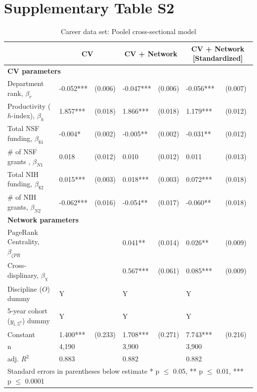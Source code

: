 \documentclass[10pt]{article}          %
\begin{document}
\section{Supplementary Table S2}
\begin{table}[h]
\begin{tabular}{m{5cm} m{1.5cm} m{1.5cm} m{1.5cm} m{1.5cm} p{1.5cm} p{1.5cm} }
\hline
\hline
& \multicolumn{2}{c}{\textbf{CV}} & \multicolumn{2}{c}{\textbf{CV + Network}} & \multicolumn{2}{c}{\textbf{CV + Network [Standardized]}} \\ \hline
\multicolumn{7}{l}{\textbf{CV parameters}} \\
{Department rank, $\beta_r$}          & -0.052***  & (0.006) & -0.047***  & (0.006) & -0.056***   & (0.007) \\
{Productivity ($h$-index), $\beta_h$} & 1.857***   & (0.018) & 1.866***   & (0.018) & 1.179***    & (0.012) \\
{Total NSF funding, $\beta_{\$1}$}    & -0.004*    & (0.002) & -0.005**   & (0.002) & -0.031**    & (0.012) \\
{\# of NSF grants , $\beta_{N1}$}     & 0.018      & (0.012) & 0.010      & (0.012) & 0.011       & (0.013) \\
{Total NIH funding, $\beta_{\$2}$}    & 0.015***   & (0.003) & 0.018***   & (0.003) & 0.072***    & (0.018) \\
{\# of NIH grants, $\beta_{N2}$}      & -0.062***  & (0.016) & -0.054**   & (0.017) & -0.060**    & (0.018) \\ \hline

\multicolumn{7}{l}{\textbf{Network parameters}} \\
{PageRank Centrality, $\beta_{\zeta PR}$}   &  &            & 0.041**     & (0.014) & 0.026**   & (0.009) \\
{Cross-displinary, $\beta_{\chi}$}       &  &            & 0.567***    & (0.061) & 0.085***  & (0.009) \\ \hline

{Discipline ($O$) dummy}                & Y &  & Y &  & Y &  \\
{5-year cohort ($y_{i,5^0}$) dummy}   & Y &  & Y &  & Y & \\
{Constant}                            & 1.400*** & (0.233) & 1.708*** & (0.271) & 7.743*** & (0.216) \\ \hline

{n}                                   & 4,190 &  & 3,900 &  & 3,900 & \\
{adj. $R^2$}                          & 0.883 &  & 0.882 &  & 0.882 & \\ \hline \hline
\multicolumn{7}{l}{\footnotesize{Standard errors in parentheses below estimate * p $\leq$ 0.05, ** p $\leq$ 0.01, *** p $\leq$ 0.0001}}

\end{tabular}
\caption{Career data set: Poolel cross-sectional model}
\label{tbl:sT2}
\end{table}
\end{document}
